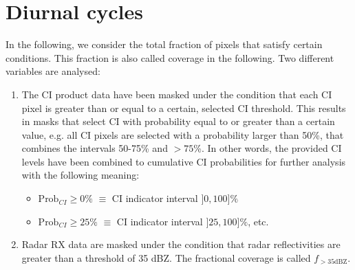 

\section{Diurnal cycles}
\label{sec:diurnal_cycle}
In the following, we consider the total fraction of pixels that satisfy certain conditions. This fraction is also called coverage in the following. Two different variables are analysed:
\begin{enumerate}
\item The CI product data have been masked under the condition that each CI pixel is greater than or equal to a certain, selected CI threshold. This results in masks that select CI with probability equal to or greater than a certain value, e.g. all CI pixels are selected with a probability larger than 50\%, that combines the intervals 50-75\% and $>75$\%. In other words, the provided CI levels have been combined to cumulative CI probabilities for further analysis with the following meaning:
\begin{itemize}
    \item $\textrm{Prob}_{CI}\ge 0\%$  $\equiv$  CI indicator interval $]0, 100] \%$
    \item $\textrm{Prob}_{CI}\ge 25\%$  $\equiv$  CI indicator interval $]25, 100] \%$, etc.
\end{itemize}
\item Radar RX data are masked under the condition that radar reflectivities are greater than a threshold of 35 dBZ. The fractional coverage is called $f_{>35 \mathrm{dBZ}}$.
\end{enumerate}


